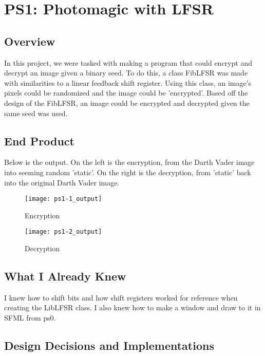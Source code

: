 \section{PS1: Photomagic with LFSR}\label{sec:ps1}

\subsection{Overview}\label{sec:ps1:overview} %

In this project, we were tasked with making a program that could encrypt and decrypt an image given a binary seed.
To do this, a class FibLFSR was made with similarities to a linear feedback shift register.
Using this class, an image's pixels could be randomized and the image could be 'encrypted'.  
Based off the design of the FibLFSR, an image could be encrypted and decrypted given the same seed was used.

\subsection{End Product}\label{sec:ps1:accomplish} %

Below is the output.
On the left is the encryption, from the Darth Vader image into seeming random 'static'.
On the right is the decryption, from 'static' back into the original Darth Vader image.

\begin{figure}[h]
\centering
\begin{minipage}[b]{0.4\textwidth}
\texttt{[image: ps1-1\_output]}
\caption{Encryption}
\end{minipage}
\hfill
\begin{minipage}[b]{0.4\textwidth}
\texttt{[image: ps1-2\_output]}
\caption{Decryption}
\end{minipage}
\end{figure}

\subsection{What I Already Knew}\label{sec:ps1:knew} %

I knew how to shift bits and how shift registers worked for reference when creating the LibLFSR class.
I also knew how to make a window and draw to it in SFML from ps0.

\subsection{Design Decisions and Implementations}\label{sec:ps1:decisions} %

